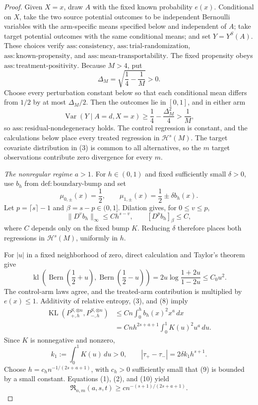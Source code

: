 \documentclass{article}
\begin{document}
\begin{proof}
Given \(X=x\), draw \(A\) with the fixed known probability \(e(x)\). Conditional on \(X\), take the two source potential outcomes to be independent Bernoulli variables with the arm-specific means specified below and independent of \(A\); take target potential outcomes with the same conditional means; and set \(Y=Y^S(A)\). These choices verify \(\mathrm{ass:consistency}\), \(\mathrm{ass:trial\text{-}randomization}\), \(\mathrm{ass:known\text{-}propensity}\), and \(\mathrm{ass:mean\text{-}transportability}\). The fixed propensity obeys \(\mathrm{ass:treatment\text{-}positivity}\). Because \(M>4\), put
\[
 \Delta_M=\sqrt{\frac14-\frac1M}>0.
\]
Choose every perturbation constant below so that each conditional mean differs from \(1/2\) by at most \(\Delta_M/2\). Then the outcomes lie in \([0,1]\), and in either arm
\[
 \operatorname{Var}(Y\mid A=d,X=x)
 \ge \frac14-\frac{\Delta_M^2}{4}
 >\frac1M,
\tag{5}
\]
so \(\mathrm{ass:residual\text{-}nondegeneracy}\) holds. The control regression is constant, and the calculations below place every treated regression in \(\mathcal H^s(M)\). The target covariate distribution in (3) is common to all alternatives, so the \(m\) target observations contribute zero divergence for every \(m\).

\emph{The nonregular regime \(a>1\).}
For \(h\in(0,1)\) and fixed sufficiently small \(\delta>0\), use \(b_h\) from \(\mathrm{def:boundary\text{-}bump}\) and set
\[
 \mu_{0,\pm}(x)=\frac12,
 \qquad
 \mu_{1,\pm}(x)=\frac12\pm\delta b_h(x).
\tag{6}
\]
Let \(p=\lceil s\rceil-1\) and \(\beta=s-p\in(0,1]\). Dilation gives, for \(0\le v\le p\),
\[
 \lVert D^v b_h\rVert_\infty\le C h^{s-v},
 \qquad [D^p b_h]_{\beta}\le C,
\tag{7}
\]
where \(C\) depends only on the fixed bump \(K\). Reducing \(\delta\) therefore places both regressions in \(\mathcal H^s(M)\), uniformly in \(h\).

For \(|u|\) in a fixed neighborhood of zero, direct calculation and Taylor's theorem give
\[
 \operatorname{kl}\!\left(
  \operatorname{Bern}\!\left(\frac12+u\right),
  \operatorname{Bern}\!\left(\frac12-u\right)
 \right)
 =2u\log\frac{1+2u}{1-2u}
 \le C_0u^2.
\tag{8}
\]
The control-arm laws agree, and the treated-arm contribution is multiplied by \(e(x)\le1\). Additivity of relative entropy, (3), and (8) imply
\[
 \begin{aligned}
 \operatorname{KL}(P_{+,h}^{S,\otimes n},P_{-,h}^{S,\otimes n})
 &\le Cn\int_0^h b_h(x)^2x^a\,dx\\
 &=Cnh^{2s+a+1}\int_0^1K(u)^2u^a\,du.
 \end{aligned}
\tag{9}
\]
Since \(K\) is nonnegative and nonzero,
\[
 k_1:=\int_0^1K(u)\,du>0,
 \qquad
 |\tau_+-\tau_-|=2\delta k_1h^{s+1}.
\tag{10}
\]
Choose \(h=c_hn^{-1/(2s+a+1)}\), with \(c_h>0\) sufficiently small that (9) is bounded by a small constant. Equations (1), (2), and (10) yield
\[
 \mathfrak R_{n,m}(a,s,t)
 \ge c n^{-(s+1)/(2s+a+1)}.
\tag{11}
\]


\end{proof}
\end{document}
